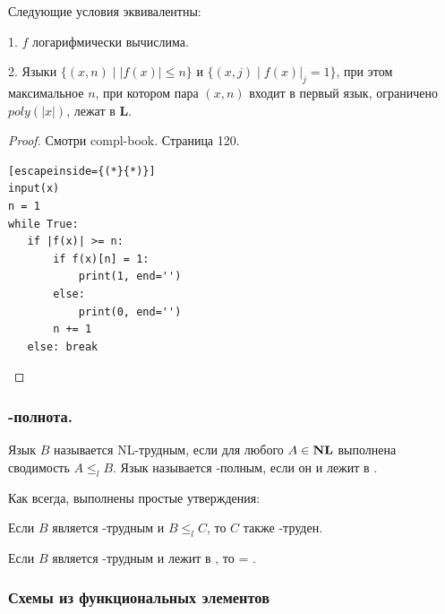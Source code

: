 \begin{lemma} Следующие условия эквивалентны:

1. $f$ логарифмически вычислима.

2. Языки $\{ (x, n) \mid |f(x)| \leq n \}$ и $\{(x, j) \mid f(x)|_j = 1\}$, при этом максимальное $n$, при котором пара $(x, n)$ входит в первый язык, ограничено $poly(|x|)$, лежат в $\mathbf{L}$.
\end{lemma}

\begin{proof}

    Смотри compl-book. Страница 120.

    
\begin{lstlisting}[escapeinside={(*}{*)}]
input(x)
n = 1
while True:
   if |f(x)| >= n:
       if f(x)[n] = 1:
           print(1, end='')
       else: 
           print(0, end='')
       n += 1
   else: break
\end{lstlisting}

\end{proof}

\subsubsection{\nlsp-полнота.}
\begin{definition}
    Язык $B$ называется NL-трудным, если для любого $A \in \textbf{NL}$ выполнена сводимость $A \leq_l B$. Язык называется \nlsp-полным, если он  и лежит в \nlsp.
\end{definition} 

Как всегда, выполнены простые утверждения:
\begin{statement}
    Если $B$ является \nlsp-трудным и $B \leq_l C$, то $C$ также
\nlsp-труден.
\end{statement}
\begin{statement}
    Если $B$ является \nlsp-трудным и лежит в \lsp, то \lsp =
\nlsp.
\end{statement}
\subsubsection{Схемы из функциональных элементов}



